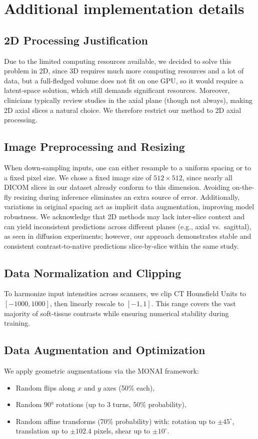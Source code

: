 \documentclass{article}
\begin{document}
\section{Additional implementation details}
\label{app:materials}

\subsection{2D Processing Justification}
Due to the limited computing resources available, we decided to solve this problem in 2D, since 3D requires much more computing resources and a lot of data, but a full-fledged volume does not fit on one GPU, so it would require a latent‐space solution, which still demands significant resources. Moreover, clinicians typically review studies in the axial plane (though not always), making 2D axial slices a natural choice. We therefore restrict our method to 2D axial processing.

\subsection{Image Preprocessing and Resizing}
When down‐sampling inputs, one can either resample to a uniform spacing or to a fixed pixel size. We chose a fixed image size of \(512\times512\), since nearly all DICOM slices in our dataset already conform to this dimension. Avoiding on‐the‐fly resizing during inference eliminates an extra source of error. Additionally, variations in original spacing act as implicit data augmentation, improving model robustness. We acknowledge that 2D methods may lack inter‐slice context and can yield inconsistent predictions across different planes (e.g., axial vs.\ sagittal), as seen in diffusion experiments; however, our approach demonstrates stable and consistent contrast‐to‐native predictions slice‐by‐slice within the same study.

\subsection{Data Normalization and Clipping}
To harmonize input intensities across scanners, we clip CT Hounsfield Units to \([-1000, 1000]\), then linearly rescale to \([-1,1]\). This range covers the vast majority of soft‐tissue contrasts while ensuring numerical stability during training.

\subsection{Data Augmentation and Optimization}
We apply geometric augmentations via the MONAI framework:
\begin{itemize}
  \item Random flips along \(x\) and \(y\) axes (50\% each),
  \item Random 90° rotations (up to 3 turns, 50\% probability),
  \item Random affine transforms (70\% probability) with: rotation up to \(\pm45^\circ\), translation up to \(\pm102.4\) pixels, shear up to \(\pm10^\circ\).
\end{itemize}
\end{document}
